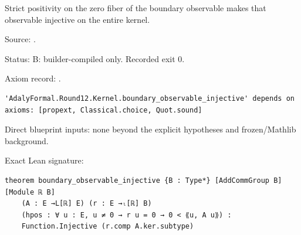 \begin{theorem}[bp-219]
\label{bp-219}
\uses{}
\leanok
Strict positivity on the zero fiber of the boundary observable makes that observable injective on the entire kernel.

\par Source: \texttt{}.
\par Status: B: builder-compiled only. Recorded exit 0.
\par Axiom record: \texttt{}.
\begin{verbatim}
'AdalyFormal.Round12.Kernel.boundary_observable_injective' depends on axioms: [propext, Classical.choice, Quot.sound]
\end{verbatim}
\par Direct blueprint inputs: none beyond the explicit hypotheses and frozen/Mathlib background.
\par Exact Lean signature:
\begin{verbatim}
theorem boundary_observable_injective {B : Type*} [AddCommGroup B] [Module ℝ B]
    (A : E →L[ℝ] E) (r : E →ₗ[ℝ] B)
    (hpos : ∀ u : E, u ≠ 0 → r u = 0 → 0 < ⟪u, A u⟫) :
    Function.Injective (r.comp A.ker.subtype)
\end{verbatim}
\end{theorem}


